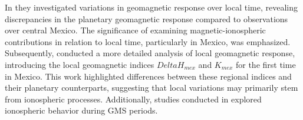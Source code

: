 \documentclass[12pt]{article}
\begin{document}
In \cite{lenica} they investigated variations in geomagnetic response over local time, revealing discrepancies in the planetary geomagnetic response compared to observations over central Mexico. The significance of examining magnetic-ionospheric contributions in relation to local time, particularly in Mexico, was emphasized. Subsequently, \cite{P-corona2} conducted a more detailed analysis of local geomagnetic response, introducing the local geomagnetic indices $Delta H_{mex}$ and $K_{mex}$ for the first time in Mexico. This work highlighted differences between these regional indices and their planetary counterparts, suggesting that local variations may primarily stem from ionospheric processes. Additionally, studies conducted in \cite{dramaria7, dramaria_13} explored ionospheric behavior during GMS periods.\\
\end{document}
